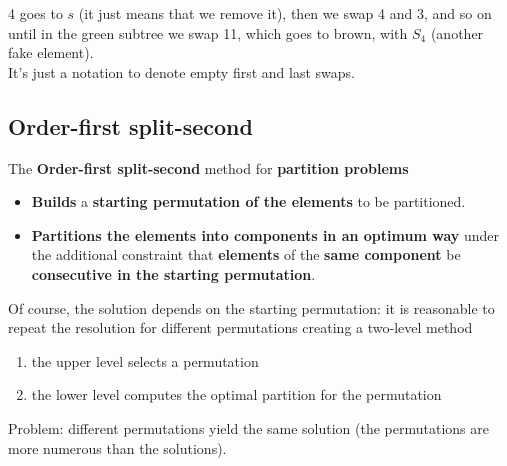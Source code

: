 4 goes to $s$ (it just means that we remove it), then we swap 4 and 3, and so on until in the green subtree we swap 11, which goes to brown, with $S_4$ (another fake element).\\

It's just a notation to denote empty first and last swaps.\\

\newpage

\subsection{Order-first split-second}

The \textbf{Order-first split-second} method for \textbf{partition problems}
\begin{itemize}
	\item \textbf{Builds} a \textbf{starting permutation of the elements} to be partitioned.\\
	
	\item \textbf{Partitions the elements into components in an optimum way} under the additional constraint that \textbf{elements} of the \textbf{same component} be \textbf{consecutive in the starting permutation}.\\
\end{itemize}

Of course, the solution depends on the starting permutation: it is reasonable to repeat the resolution for different permutations creating a two-level method
\begin{enumerate}
	\item the upper level selects a permutation
	
	\item the lower level computes the optimal partition for the permutation
\end{enumerate}

Problem: different permutations yield the same solution (the permutations are more numerous than the solutions).\\



